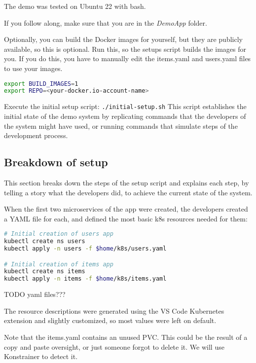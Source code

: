 The demo was tested on Ubuntu 22 with bash.

If you follow along, make sure that you are in the \emph{DemoApp} folder.

Optionally, you can build the Docker images for yourself, but they are publicly available, so this is optional. Run this, so the setups script builds the images for you. If you do this, you have to manually edit the items.yaml and users.yaml files to use your images.

\begin{lstlisting}[caption={Optional: Build images},language=bash,label=code:bash1]
export BUILD_IMAGES=1
export REPO=<your-docker.io-account-name>
\end{lstlisting}

Execute the initial setup script: \texttt{./initial-setup.sh} This script establishes the initial state of the demo system by replicating commands that the developers of the system might have used, or running commands that simulate steps of the development process.

\subsection{Breakdown of setup}

This section breaks down the steps of the setup script and explains each step, by telling a story what the developers did, to achieve the current state of the system.

When the first two microservices of the app were created, the developers created a YAML file for each, and defined the most basic k8s resources needed for them:

\begin{lstlisting}[caption={Create first deployment},language=bash,label=code:bash3]
# Initial creation of users app
kubectl create ns users
kubectl apply -n users -f $home/k8s/users.yaml

# Initial creation of items app
kubectl create ns items
kubectl apply -n items -f $home/k8s/items.yaml
\end{lstlisting}

TODO yaml files???

The resource descriptions were generated using the VS Code Kubernetes extension and slightly customized, so most values were left on default.

Note that the items.yaml contains an unused PVC. This could be the result of a copy and paste oversight, or just someone forgot to delete it. We will use Konstrainer to detect it.

